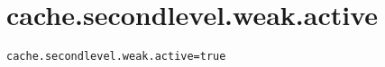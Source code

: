 \section{cache.secondlevel.weak.active}
\label{configuration:CacheSecondlevelWeakActive}
\ClearAPI
\TODO
{}
\begin{lstlisting}[style=Props,caption={Usage example for \textit{cache.secondlevel.weak.active}}]
cache.secondlevel.weak.active=true
\end{lstlisting}